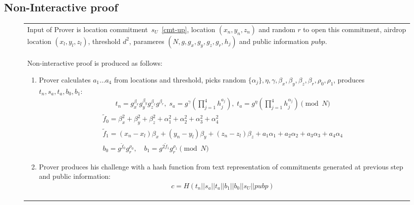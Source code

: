 \documentclass{article}
\begin{document}
\subsection {Non-Interactive proof}
\begin{figure}[!htb]
\begin{tabular}{|p{\linewidth}|}
\hline

Input of Prover is
  location commitment~$s_U$~\eqref{cmt-up},
  location $(x_n, y_n, z_n)$ and random $r$ to open this commitment,
  airdrop location $(x_l, y_l, z_l)$,
  threshold $d^2$,
  parameres $(N, g, g_x, g_y, g_z, g_r, h_j)$
  and public information $pubp$.
\\
Non-interactive proof is produced as follows:
\begin{enumerate}
\item
  Prover calculates $a_1 \dots a_4$ from locations and threshold,
  picks random $\{\alpha_j\}, \eta, \gamma, \beta_x, \beta_y, \beta_z, \beta_r, \rho_0, \rho_1$,
  produces $t_n, s_a, t_a, b_0, b_1$:
\begin{gather}
  t_n = g_x^{\beta_x} g_y^{\beta_y} g_z^{\beta_z} g^{\beta_r}, \;
  s_a = g^{\gamma} (\prod_{j=1}^4 h_j^{a_j}),  \;
  t_a = g^{\eta} (\prod_{j=1}^4 h_j^{\alpha_j}) \pmod{N}
\end{gather}
\begin{gather}
  \tilde f_0 = \beta_x^2 + \beta_y^2 +\beta_z^2 + \alpha_1^2 + \alpha_2^2 + \alpha_3^2 + \alpha_4^2  \\
  \tilde f_1 = (x_n - x_l) \beta_x  + (y_n - y_l) \beta_y  + (z_n - z_l) \beta_z + a_1 \alpha_1 + a_2 \alpha_2 + a_3 \alpha_3 + a_4 \alpha_4 \\
  b_0 = g^{\tilde f_0} g_r^{\rho_0},   \quad
  b_1 = g^{2 \tilde f_1} g_r^{\rho_1} \pmod{N}
\end{gather}

\item
  Prover produces his challenge with a hash function
  from text representation of commitments generated at previous step and public information:
\begin{gather}
  c = H(t_n || s_a || t_a || b_1 || b_0 || s_U || pubp)
\end{gather}


\end{enumerate}
\end{tabular}
\end{figure}
\end{document}
